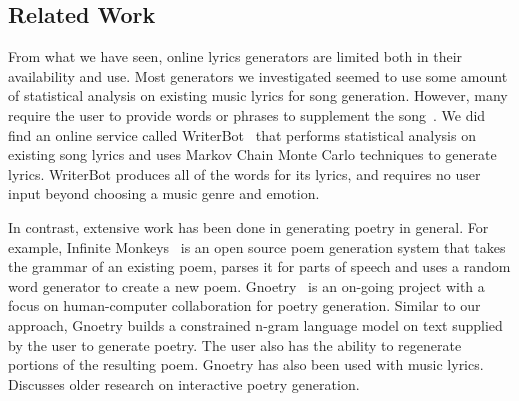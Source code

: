 \documentclass{vgtc}                          %
\begin{document}

\subsection{Related Work}

From what we have seen, online lyrics generators are limited both in their availability and use.
Most generators we investigated seemed to use some amount of statistical analysis on existing
music lyrics for song generation. However, many require the user to provide words or phrases
to supplement the song~\cite{generator1,generator2}.
We did find an online service called WriterBot~\cite{writerbot} that performs statistical analysis on existing
song lyrics and uses Markov Chain Monte Carlo techniques to generate lyrics. WriterBot
produces all of the words for its lyrics, and requires no user input beyond choosing
a music genre and emotion.

In contrast, extensive work has been done in generating poetry in general.
For example, Infinite Monkeys~\cite{infinitemonkeys} is an open source
poem generation system that takes the grammar of an existing poem, parses it for
parts of speech and uses a random word generator to create a new poem.
Gnoetry~\cite{gnoetry} is an on-going project with a focus on human-computer collaboration
for poetry generation. Similar to our approach, Gnoetry builds a constrained n-gram
language model on text supplied by the user to generate poetry. The user also
has the ability to regenerate portions of the resulting poem. Gnoetry has also
been used with music lyrics. \cite{ipoetry} Discusses older research on interactive
poetry generation.
\end{document}
